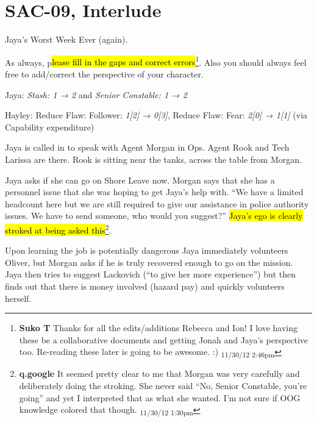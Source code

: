 \setcounter{chapter}{ 10 }
\chapter{\textbf{SAC-09, Interlude} }







Jaya's Worst Week Ever (again).  



As always, p\hl{lease fill in the gaps and correct errors}\footnote{\textbf{Suko T }Thanks for all the edits/additions Rebecca and Ion!  I love having these be a collaborative documents and getting Jonah and Jaya's perspective too.  Re-reading these later is going to be awesome.  :) \textsubscript{11/30/12 2:46pm}}.  Also you should always feel free to add/correct the perspective of your character.


Jaya: \textit{Stash: 1 → 2} and \textit{Senior Constable: 1 → 2}

Hayley: Reduce Flaw: Follower: \textit{1{[}2{]} → 0{[}3{]}}, Reduce Flaw: Fear: \textit{2{[}0{]} → 1{[}1{]}} (via Capability expenditure)




Jaya is called in to speak with Agent Morgan in Ops.  Agent Rook and Tech Larissa are there.  Rook is sitting near the tanks, across the table from Morgan.



Jaya asks if she can go on Shore Leave now.  Morgan says that she has a personnel issue that she was hoping to get Jaya's help with.  ``We have a limited headcount here but we are still required to give our assistance in police authority issues.  We have to send someone, who would you suggest?''  \hl{Jaya's ego is clearly stroked at being asked this}\footnote{\textbf{q.google }It seemed pretty clear to me that Morgan was very carefully and deliberately doing the stroking.  She never said ``No, Senior Constable, you're going'' and yet I interpreted that as what she wanted.  I'm not sure if OOG knowledge colored that though. \textsubscript{11/30/12 1:30pm}}.



Upon learning the job is potentially dangerous Jaya immediately volunteers Oliver, but Morgan asks if he is truly recovered enough to go on the mission.  Jaya then tries to suggest Lackovich (``to give her more experience'') but then finds out that there is money involved (hazard pay) and quickly volunteers herself.



